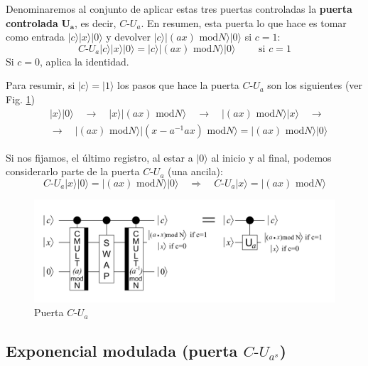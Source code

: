 \documentclass[a4paper,11pt]{book} %
\numberwithin{equation}{chapter}
\begin{document}
Denominaremos al conjunto de aplicar estas tres puertas controladas la \textbf{puerta controlada} $\bm{U_a}$, es decir, $C\text{-}U_a$. En resumen, esta puerta lo que hace es tomar como entrada $| c \rangle | x \rangle |0 \rangle$ y devolver  $| c \rangle | (ax) \text{ mod} N  \rangle |0 \rangle$ si $c=1$:
	\begin{equation}
	\boxed{C\text{-}U_a | c \rangle | x \rangle |0 \rangle = | c \rangle | (ax) \text{ mod} N  \rangle |0 \rangle \qquad \text{ si } c = 1}
	\end{equation}
Si $c=0$, aplica la identidad.

Para resumir, si $|c \rangle = | 1 \rangle$ los pasos que hace la puerta $C\text{-}U_a$ son los siguientes (ver Fig. \ref{Fig_idea_C-U_a})
\begin{align*}
& | x \rangle | 0 \rangle  \quad \rightarrow \quad |x \rangle | (ax) \text{ mod}N \rangle \quad \rightarrow \quad  | (ax) \text{ mod}N \rangle |x \rangle \quad \rightarrow \\
&\rightarrow \quad | (ax) \text{ mod}N \rangle  | (x - a^{-1}ax) \text{ mod}N \rangle = | (ax) \text{ mod}N \rangle | 0\rangle
\end{align*}

Si nos fijamos, el último registro, al estar a $|0 \rangle$ al inicio y al final, podemos considerarlo parte de la puerta $C\text{-}U_{a}$ (una ancila):
	\begin{equation}
	C\text{-}U_a | x \rangle |0\rangle = |(ax) \text{ mod} N \rangle |0 \rangle \quad \Rightarrow \quad \boxed{C\text{-}U_a | x \rangle  = |(ax) \text{ mod} N \rangle}
	\end{equation}


\begin{figure}[H]
\centering 
\includegraphics[width=0.8\linewidth]{Figuras/Fig-C-U_a.png}
\caption{Puerta $C\text{-}U_a$}
\label{Fig_idea_C-U_a}
\end{figure}

\subsection{Exponencial modulada (puerta $C\text{-}U_{a^{s}}$)} \label{sec_2n+3-Puerta-C-U_a^s}
\end{document}
